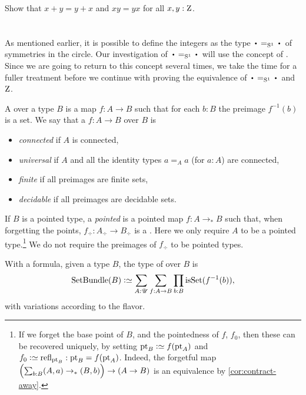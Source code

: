 \begin{xca}\label{xca:commutative-add-Z}
  Show that $x+y = y+x$ and $xy=yx$ for all $x,y:\mathrm{Z}$.
\end{xca}

\section{\Coverings}
\label{sec:covering}

As mentioned earlier, it is possible to define the integers as the
type $\base=_{\Sc}\base$ of symmetries in the circle.
Our investigation of $\base=_{\Sc}\base$ will use the concept of \coverings.
Since we are going to return to this concept several times,
we take the time for a fuller treatment before we continue with
proving the equivalence of $\base=_{\Sc}\base$ and $\mathrm{Z}$.

\begin{definition}\label{def:covering}
A \emph{\covering} over a type $B$
is a map $f:A\to B$ such that for each $b:B$ the preimage $f^{-1}(b)$ is a set.
We say that a \covering $f:A\to B$ over $B$ is
\begin{itemize}
\item \emph{connected} if $A$ is connected,
\item \emph{universal} if $A$ and all
the identity types $a=_Aa$ (for $a:A$) are connected,
\item \emph{finite} if all preimages are finite sets,
\item \emph{decidable} if all preimages are decidable sets.
\end{itemize}
If $B$ is a pointed type, a \emph{pointed} \covering is a pointed map $f:A\to_*B$ such that, when forgetting the points, $f_\div:A_\div\to B_\div$ is a \covering. Here we only
require $A$ to be a pointed type.\footnote{%
  If we forget the base point of $B$, and the pointedness of $f$, $f_0$,
  then these can be recovered uniquely, by setting $\pt_B \defeq f(\pt_A)$
  and $f_0 \defeq \refl{\pt_B} : \pt_B = f(\pt_A)$.
  Indeed, the forgetful map $\Bigl(\sum_{b:B}(A,a)\to_\ast(B,b)\Bigr)
  \to (A \to B)$ is an equivalence by \cref{cor:contract-away}.}
We do not require the preimages of $f_\div$ to be pointed types.
\end{definition}
With a formula, given a type $B$, the type of \coverings over $B$ is
\[
\SetBundle(B) \defeq \sum_{A:\UU}\sum_{f:A\to B}\prod_{b:B}\isset(f^{-1}(b)),
\]
with variations according to the flavor.


